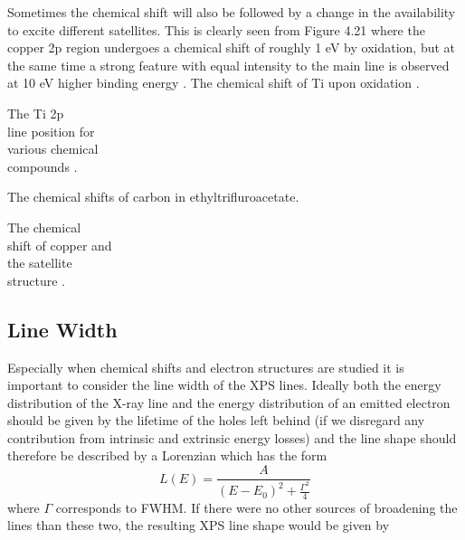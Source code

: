              Sometimes the chemical shift will also be followed by a
          change in the availability to excite different satellites. This
          is clearly seen from Figure 4.21 where the copper 2p region
          undergoes a chemical shift of roughly 1 eV by oxidation, but
          at the same time a strong feature with equal intensity to
          the main line is observed at 10 eV higher binding energy \cite{perkin}.
        \newpage
\vspace*{19cm}
 The chemical shift of Ti upon oxidation \cite{perkin}.

                \newpage
{} The Ti 2p\\ line position
         for\\ various chemical\\ compounds \cite{perkin}.\\
         \vspace*{18cm}


          The chemical shifts of
          carbon in ethyltrifluroacetate.

                                         \newpage


             The chemical\\ shift of
        copper and\\ the satellite\\ structure \cite{perkin}.\\

\vspace{12cm}



              \subsection{Line Width}



          Especially when chemical shifts and  electron  structures  are
          studied it is important to consider the line width of the XPS
          lines. Ideally  both the energy  distribution  of  the
          X-ray  line  and  the  energy  distribution  of  an  emitted
          electron  should be given by the lifetime of the holes left behind (if
          we disregard any contribution from intrinsic  and  extrinsic
          energy  losses)  and  the  line shape  should  therefore   be
          described by a Lorenzian which has the form
          \begin{equation}
          L(E)= \frac{A}{(E-E_{0})^{2}+\frac{\Gamma^{2}}{4}}
          \end{equation}
          where $\Gamma$ corresponds to FWHM. If there were  no  other
          sources of  broadening    the  lines  than  these  two,  the
          resulting XPS line shape would be given by

